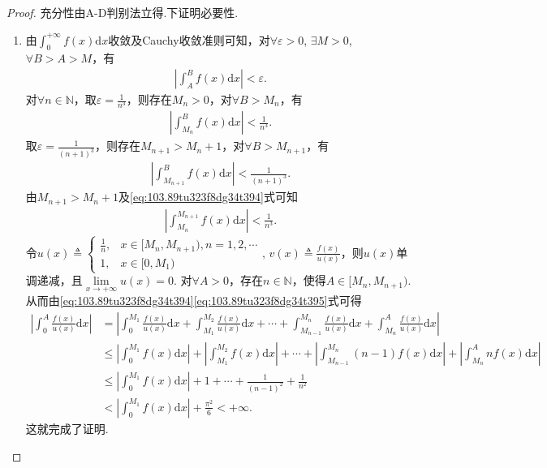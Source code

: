 \documentclass[../../main.tex]{subfiles}%
\begin{document}
\begin{proof}

充分性由A-D判别法立得.下证明必要性.
\begin{enumerate}
\item 由$\int_0^{+\infty} f(x)\mathrm{d}x$收敛及Cauchy收敛准则可知，对$\forall \varepsilon >0$, $\exists M>0$, $\forall B>A>M$，有
\begin{align*}
\left| \int_A^B f(x)\mathrm{d}x \right| < \varepsilon.
\end{align*}
对$\forall n\in \mathbb{N}$，取$\varepsilon = \frac{1}{n^3}$，则存在$M_n>0$，对$\forall B>M_n$，有
\begin{align}
\left| \int_{M_n}^B f(x)\mathrm{d}x \right| < \frac{1}{n^3}. \label{eq:103.89tu323f8dg34t394}
\end{align}
取$\varepsilon = \frac{1}{(n+1)^3}$，则存在$M_{n+1}>M_n+1$，对$\forall B>M_{n+1}$，有
\begin{align*}
\left| \int_{M_{n+1}}^B f(x)\mathrm{d}x \right| < \frac{1}{(n+1)^3}.
\end{align*}
由$M_{n+1}>M_n+1$及\eqref{eq:103.89tu323f8dg34t394}式可知
\begin{align}\label{eq:103.89tu323f8dg34t395}
\left| \int_{M_n}^{M_{n+1}} f(x)\mathrm{d}x \right| < \frac{1}{n^3}.
\end{align}
令$u(x) \triangleq \begin{cases} 
\frac{1}{n}, & x\in [M_n, M_{n+1}),n=1,2,\cdots \\
1, & x\in [0, M_1)
\end{cases}$, $v(x) \triangleq \frac{f(x)}{u(x)}$，则$u(x)$单调递减，且$\lim\limits_{x\rightarrow +\infty} u(x) = 0$.
对$\forall A>0$，存在$n\in \mathbb{N}$，使得$A\in [M_n, M_{n+1})$. 从而由\eqref{eq:103.89tu323f8dg34t394}\eqref{eq:103.89tu323f8dg34t395}式可得
\begin{align*}
\left| \int_0^A \frac{f(x)}{u(x)}\mathrm{d}x \right| &= \left| \int_0^{M_1} \frac{f(x)}{u(x)}\mathrm{d}x + \int_{M_1}^{M_2} \frac{f(x)}{u(x)}\mathrm{d}x + \cdots + \int_{M_{n-1}}^{M_n} \frac{f(x)}{u(x)}\mathrm{d}x + \int_{M_n}^A \frac{f(x)}{u(x)}\mathrm{d}x \right| \\
&\leqslant \left| \int_0^{M_1} f(x)\mathrm{d}x \right| + \left| \int_{M_1}^{M_2} f(x)\mathrm{d}x \right| + \cdots + \left| \int_{M_{n-1}}^{M_n} (n-1)f(x)\mathrm{d}x \right| + \left| \int_{M_n}^A nf(x)\mathrm{d}x \right| \\
&\leqslant \left| \int_0^{M_1} f(x)\mathrm{d}x \right| + 1 + \cdots + \frac{1}{(n-1)^2} + \frac{1}{n^2} \\
&< \left| \int_0^{M_1} f(x)\mathrm{d}x \right| + \frac{\pi^2}{6} < +\infty.
\end{align*}
这就完成了证明.


\end{enumerate}
\end{proof}
\end{document}
